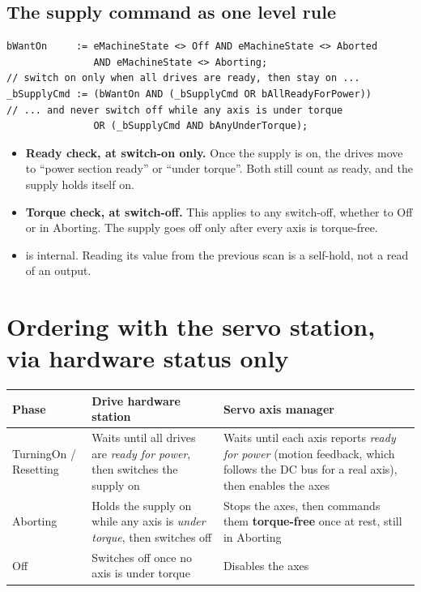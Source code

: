 \documentclass[11pt,a4paper]{report}
\DeclareRobustCommand{\code}[1]{\texttt{\detokenize{#1}}}
\begin{document}
\subsection*{The supply command as one level rule}

\begin{lstlisting}
bWantOn     := eMachineState <> Off AND eMachineState <> Aborted
               AND eMachineState <> Aborting;
// switch on only when all drives are ready, then stay on ...
_bSupplyCmd := (bWantOn AND (_bSupplyCmd OR bAllReadyForPower))
// ... and never switch off while any axis is under torque
               OR (_bSupplyCmd AND bAnyUnderTorque);
\end{lstlisting}

\begin{itemize}
  \item \textbf{Ready check, at switch-on only.} Once the supply is on, the drives move to
        ``power section ready'' or ``under torque''. Both still count as ready, and the supply
        holds itself on.
  \item \textbf{Torque check, at switch-off.} This applies to any switch-off, whether to Off or
        in Aborting. The supply goes off only after every axis is torque-free.
  \item \code{_bSupplyCmd} is internal. Reading its value from the previous scan is a self-hold,
        not a read of an output.
\end{itemize}

\section{Ordering with the servo station, via hardware status only}\label{sec:ordering}

\begin{xltabular}{\linewidth}{P{2.6cm} L L}
\toprule
\textbf{Phase} & \textbf{Drive hardware station} & \textbf{Servo axis manager} \\
\midrule
TurningOn / Resetting & Waits until all drives are \emph{ready for power}, then switches the supply on & Waits until each axis reports \emph{ready for power} (motion feedback, which follows the DC bus for a real axis), then enables the axes \\
Aborting & Holds the supply on while any axis is \emph{under torque}, then switches off & Stops the axes, then commands them \textbf{torque-free} once at rest, still in Aborting \\
Off & Switches off once no axis is under torque & Disables the axes \\
\bottomrule
\end{xltabular}
\end{document}
